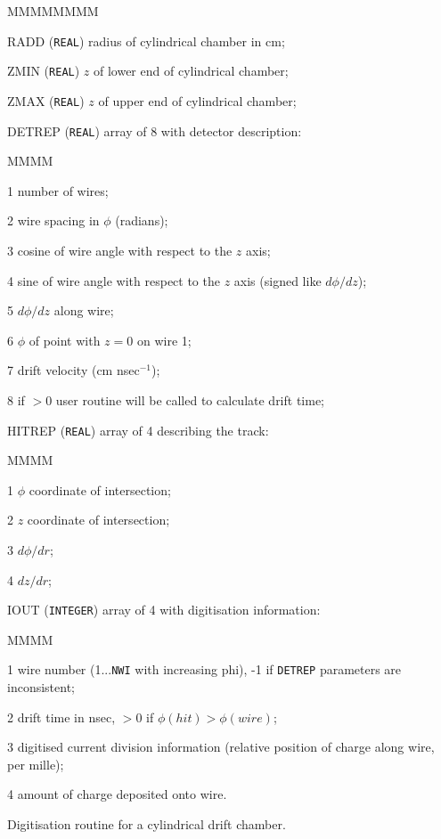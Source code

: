 \begin{DLtt}{MMMMMMMM}
\item[RADD] ({\tt REAL}) radius of cylindrical chamber in cm;
\item[ZMIN] ({\tt REAL}) $z$ of lower end of cylindrical chamber;
\item[ZMAX] ({\tt REAL}) $z$ of upper end of cylindrical chamber;
\item[DETREP] ({\tt REAL}) array of 8 with detector description:
\begin{DLtt}{MMMM}
\item[1] number of wires;
\item[2] wire spacing in $\phi$ (radians);
\item[3] cosine of wire angle with respect to the $z$ axis;
\item[4] sine of wire angle  with respect to the $z$ axis 
(signed like $d\phi/dz$);
\item[5] $d\phi/dz$ along wire;
\item[6] $\phi$ of point with $z=0$ on wire 1;
\item[7] drift velocity (cm nsec$^{-1}$);
\item[8] if $>0$ user routine 
will be called to calculate drift time;
\end{DLtt}
\item[HITREP] ({\tt REAL}) array of 4 describing the track:
\begin{DLtt}{MMMM}
\item[1] $\phi$ coordinate of intersection;
\item[2] $z$ coordinate of intersection;
\item[3] $d\phi/dr$;
\item[4] $dz/dr$;
\end{DLtt}
\item[IOUT] ({\tt INTEGER}) array of 4 with digitisation information:
\begin{DLtt}{MMMM}
\item[1] wire number (1...{\tt NWI} with increasing phi), -1 if {\tt DETREP}
parameters are inconsistent;
\item[2] drift time in nsec, $>0$ if $\phi(hit)>\phi(wire)$;
\item[3] digitised current division information
(relative position of charge along wire, per mille);
\item[4] amount of charge deposited onto wire.
\end{DLtt}
\end{DLtt}
Digitisation routine for a cylindrical drift chamber.
 
